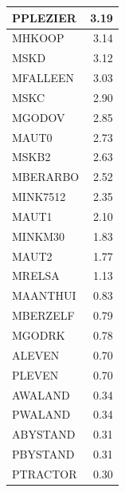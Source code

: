 \documentclass[
  12pt,
  oneside]{report}
\begin{document}
\begin{table}[H]
\begin{tabular}[t]{l|r}
\hline
PPLEZIER & 3.19\\
\hline
MHKOOP & 3.14\\
\hline
MSKD & 3.12\\
\hline
MFALLEEN & 3.03\\
\hline
MSKC & 2.90\\
\hline
MGODOV & 2.85\\
\hline
MAUT0 & 2.73\\
\hline
MSKB2 & 2.63\\
\hline
MBERARBO & 2.52\\
\hline
MINK7512 & 2.35\\
\hline
MAUT1 & 2.10\\
\hline
MINKM30 & 1.83\\
\hline
MAUT2 & 1.77\\
\hline
MRELSA & 1.13\\
\hline
MAANTHUI & 0.83\\
\hline
MBERZELF & 0.79\\
\hline
MGODRK & 0.78\\
\hline
ALEVEN & 0.70\\
\hline
PLEVEN & 0.70\\
\hline
AWALAND & 0.34\\
\hline
PWALAND & 0.34\\
\hline
ABYSTAND & 0.31\\
\hline
PBYSTAND & 0.31\\
\hline
PTRACTOR & 0.30\\
\hline
\end{tabular}
\end{table}
\end{document}
